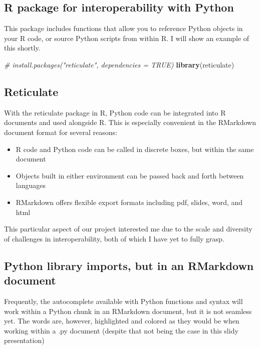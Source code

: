 \documentclass[]{article}
\newenvironment{Shaded}{\begin{snugshade}}{\end{snugshade}}
\newcommand{\KeywordTok}[1]{\textcolor[rgb]{0.13,0.29,0.53}{\textbf{#1}}}
\newcommand{\CommentTok}[1]{\textcolor[rgb]{0.56,0.35,0.01}{\textit{#1}}}
\newcommand{\NormalTok}[1]{#1}
\begin{document}
\subsection{R package for interoperability with
Python}\label{r-package-for-interoperability-with-python}

This package includes functions that allow you to reference Python
objects in your R code, or source Python scripts from within R. I will
show an example of this shortly.

\begin{Shaded}
\begin{Highlighting}[]
\CommentTok{# install.packages("reticulate", dependencies = TRUE)}
\KeywordTok{library}\NormalTok{(reticulate)}
\end{Highlighting}
\end{Shaded}

\subsection{Reticulate}\label{reticulate}

With the reticulate package in R, Python code can be integrated into R
documents and used alongside R. This is especially convenient in the
RMarkdown document format for several reasons:

\begin{itemize}
\item
  R code and Python code can be called in discrete boxes, but within the
  same document
\item
  Objects built in either environment can be passed back and forth
  between languages
\item
  RMarkdown offers flexible export formats including pdf, slides, word,
  and html
\end{itemize}

This particular aspect of our project interested me due to the scale and
diversity of challenges in interoperability, both of which I have yet to
fully grasp.

\subsection{Python library imports, but in an RMarkdown
document}\label{python-library-imports-but-in-an-rmarkdown-document}

Frequently, the autocomplete available with Python functions and syntax
will work within a Python chunk in an RMarkdown document, but it is not
seamless yet. The words are, however, highlighted and colored as they
would be when working within a .py document (despite that not being the
case in this slidy presentation)
\end{document}
